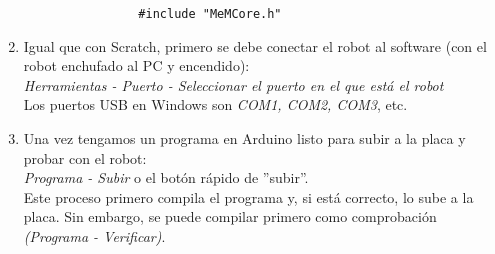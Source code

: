 \begin{enumerate}
	\begin{verbatim}	
				#include "MeMCore.h"	
	\end{verbatim}
	\item Igual que con Scratch, primero se debe conectar el robot al software (con el robot enchufado al PC y encendido):\\
	\textit{Herramientas - Puerto - Seleccionar el puerto en el que está el robot} \\
	Los puertos USB en Windows son \textit{COM1, COM2, COM3}, etc.
	\item  Una vez tengamos un programa en Arduino listo para subir a la placa y probar con el robot:\\
	\textit{Programa - Subir } o el botón rápido de ''subir''. \\
	Este proceso primero compila el programa y, si está correcto, lo sube a la placa. Sin embargo, se puede compilar primero como comprobación \textit{(Programa - Verificar)}.
\end{enumerate}
